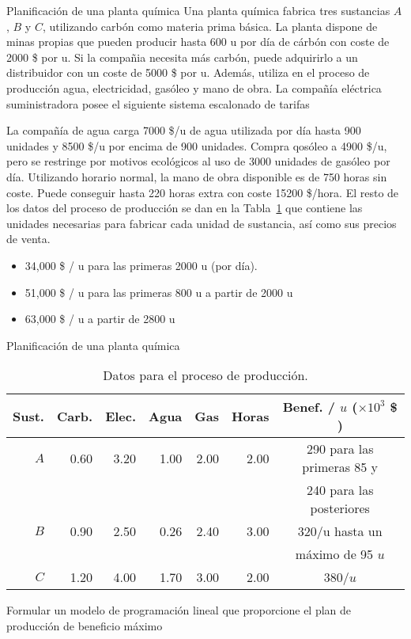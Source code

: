 \documentclass[../../main.tex]{subfiles}
\begin{document}
\begin{frame}{Planificación de una planta química}{}
Una planta química fabrica tres sustancias $A$, $B$ y $C$, utilizando carbón como materia prima básica. La planta dispone de minas propias que pueden producir hasta 600 u por día de cárbón con coste de 2000 \$ por u. Si la compañia necesita más carbón, puede adquirirlo a un distribuidor con un coste de 5000 \$ por u. Además, utiliza en el proceso de producción agua, electricidad, gasóleo y mano de obra. La compañía eléctrica suministradora posee el siguiente sistema escalonado de tarifas


La compañía de agua carga 7000 \$/u de agua utilizada por día hasta 900 unidades y 8500 \$/u por encima de 900 unidades. Compra qosóleo a 4900 \$/u, pero se restringe por motivos ecológicos al uso de 3000 unidades de gasóleo por día. Utilizando horario normal, la mano de obra disponible es de 750 horas sin coste. Puede conseguir hasta 220 horas extra con coste 15200 \$/hora. El resto de los datos del proceso de producción se dan en la Tabla~\ref{tab:data-process} que contiene las unidades necesarias para fabricar cada unidad de sustancia, así como sus precios de venta.


\begin{itemize}
\item 34,000 \$ / u para las primeras 2000 u (por día).
\item 51,000 \$ / u para las primeras 800 u a partir de 2000 u
\item 63,000 \$ / u a partir de 2800 u
\end{itemize}
  \end{frame}
  \begin{frame}{Planificación de una planta química}{}
    
    \begin{table}
      \caption{\label{tab:data-process}Datos para el proceso de producción.}
      \centering
      \begin{tabular}{rrrrrrc}
        \toprule
        Sust.&Carb.&Elec.&Agua&Gas&Horas&Benef. / $u$ ($\times 10^3$ \$ )\\
        \midrule
        $A$& 0.60 & 3.20 & 1.00 & 2.00 & 2.00& 290 para las primeras 85 y \\
        &&&&&&240 para las posteriores\\
        \midrule
        $B$&0.90&2.50&0.26&2.40&3.00&320/u hasta un\\
        &&&&&&máximo de 95 $u$\\
        \midrule
        $C$&1.20&4.00&1.70&3.00&2.00&380/$u$\\
        \bottomrule
      \end{tabular}

    \end{table}

    Formular un modelo de programación lineal que proporcione el plan de producción de beneficio máximo
  
\end{frame}
\end{document}
